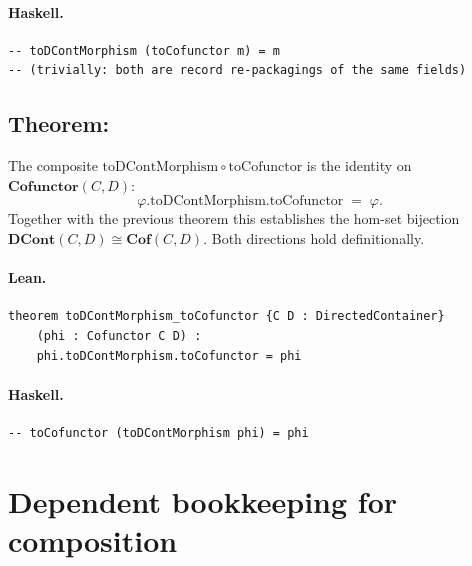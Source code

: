 \documentclass[11pt,a4paper]{article}
\begin{document}
\paragraph{Haskell.}
\begin{lstlisting}[style=haskell]
-- toDContMorphism (toCofunctor m) = m
-- (trivially: both are record re-packagings of the same fields)
\end{lstlisting}


\subsection{Theorem: }

\begin{thm}
The composite $\mathrm{toDContMorphism} \circ \mathrm{toCofunctor}$ is the
identity on $\mathbf{Cofunctor}(C,D)$:
\[
  \varphi.\mathrm{toDContMorphism}.\mathrm{toCofunctor} \;=\; \varphi.
\]
Together with the previous theorem this establishes the hom-set bijection
$\mathbf{DCont}(C,D) \cong \mathbf{Cof}(C,D)$.  Both directions hold
definitionally.
\end{thm}

\paragraph{Lean.}
\begin{lstlisting}[style=lean]
theorem toDContMorphism_toCofunctor {C D : DirectedContainer}
    (phi : Cofunctor C D) :
    phi.toDContMorphism.toCofunctor = phi
\end{lstlisting}

\paragraph{Haskell.}
\begin{lstlisting}[style=haskell]
-- toCofunctor (toDContMorphism phi) = phi
\end{lstlisting}


\section{Dependent bookkeeping for composition}

\end{document}
